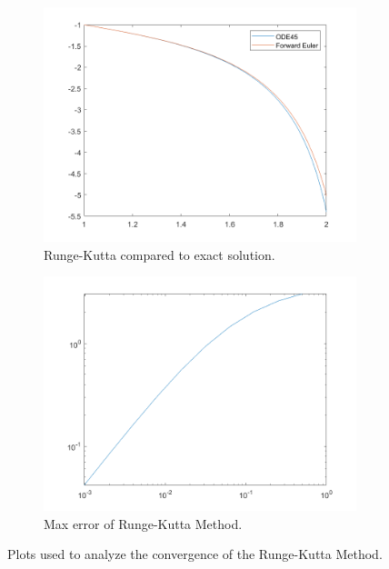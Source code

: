 \documentclass[12pt]{report}
\begin{document}
\begin{solution}
\begin{enumerate}
        \begin{figure}[H]
            \begin{subfigure}[b]{0.5\linewidth}
                \centering
                \includegraphics[width=\linewidth]{images/fe1.png}
                \caption{Runge-Kutta compared to exact solution.}
                \label{fig3:a}
                \vspace{4ex}
            \end{subfigure}%
            \begin{subfigure}[b]{0.5\linewidth}
                \centering
                \includegraphics[width=\linewidth]{images/fe2.png}
                \caption{Max error of Runge-Kutta Method.}
                \label{fig3:b}
                \vspace{4ex}
            \end{subfigure}
            \caption{Plots used to analyze the convergence of the Runge-Kutta Method.}
            \label{fig3}
        \end{figure}


\end{enumerate}
\end{solution}
\end{document}
